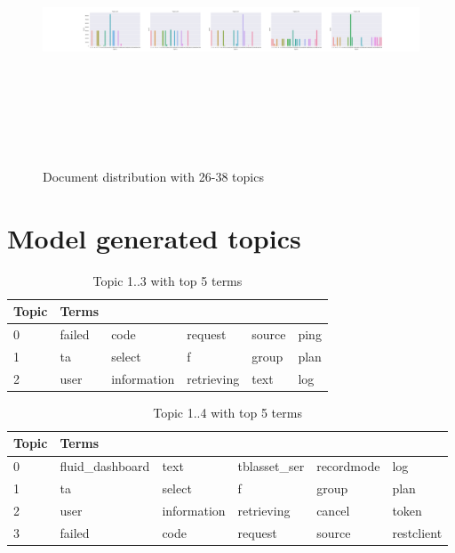 \begin{figure}[h]
    \centering
    \includegraphics[width=15cm, height=8cm]{figures/doc_distr/doc_distribution_26-38_corpus.png}
    \caption{Document distribution with 26-38 topics}
    \label{fig:Doc_distr_26-38}
\end{figure}



\FloatBarrier
\section{Model generated topics}\label{appendices:modelgeneratedtopics}

\begin{table}[!htb]
\centering
\begin{tabular}{|l|l|l|l|l|l|}
 \hline
 Topic & Terms & & & & \\
 \hline
 0 & failed & code & request & source & ping\\ 
 \hline 
 1 & ta & select & f & group & plan\\ 
 \hline 
 2 & user & information & retrieving & text & log\\ 
 \hline 
\end{tabular}
\caption{Topic 1..3 with top 5 terms}
\label{tab:3topicsmodel}
\end{table}
 
\begin{table}[!htb]
\centering
\begin{tabular}{|l|l|l|l|l|l|}
 \hline
 Topic & Terms & & & & \\
 \hline
 0 & fluid\_dashboard & text & tblasset\_ser & recordmode & log\\ 
 \hline 
 1 & ta & select & f & group & plan\\ 
 \hline 
 2 & user & information & retrieving & cancel & token\\ 
 \hline 
 3 & failed & code & request & source & restclient\\ 
 \hline 
\end{tabular}
\caption{Topic 1..4 with top 5 terms}
\label{tab:4topicsmodel}
\end{table}
 

